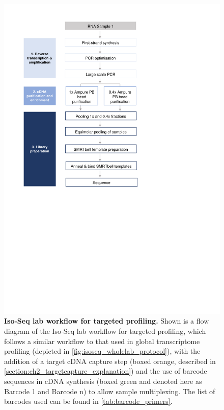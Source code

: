 \begin{figure}[]
	\begin{center}
		\includegraphics[page=2,trim={1cm 11cm 1cm 1cm},clip,scale = 0.8]{Figures/ProjectDevelopment_Figures.pdf}
	\end{center}
	\captionsetup{width=0.95\textwidth}
	\caption[Iso-Seq lab workflow for targeted profiling]%
	{\textbf{Iso-Seq lab workflow for targeted profiling.} Shown is a flow diagram of the Iso-Seq lab workflow for targeted profiling, which follows a similar workflow to that used in global transcriptome profiling (depicted in \cref{fig:isoseq_wholelab_protocol}), with the addition of a target cDNA capture step (boxed orange, described in \cref{section:ch2_targetcapture_explanation}) and the use of barcode sequences in cDNA synthesis (boxed green and denoted here as Barcode 1 and Barcode n) to allow sample multiplexing. The list of barcodes used can be found in \cref{tab:barcode_primers}.}
	\label{fig:isoseq_targetedlab_protocol}
\end{figure}

